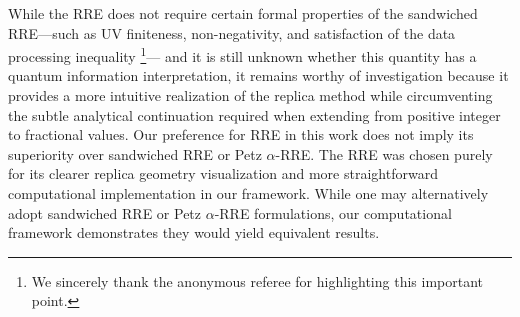 \documentclass[12pt]{article}
\begin{document}
{While the RRE does not require certain formal properties of the sandwiched RRE—such as UV finiteness, non-negativity, and satisfaction of the data processing inequality \cite{Wilde:2013bdg}\footnote{We sincerely thank the anonymous referee for highlighting this important point.}— and it is still unknown whether this quantity has a quantum information interpretation, it remains worthy of investigation because it provides a more intuitive realization of the replica method while circumventing the subtle analytical continuation required when extending from positive integer to fractional values. Our preference for RRE in this work does not imply its superiority over sandwiched RRE or Petz $\alpha$-RRE. The RRE was chosen purely for its clearer replica geometry visualization and more straightforward computational implementation in our framework. While one may alternatively adopt sandwiched RRE or Petz $\alpha$-RRE formulations, our computational framework demonstrates they would yield equivalent results. }
\end{document}
